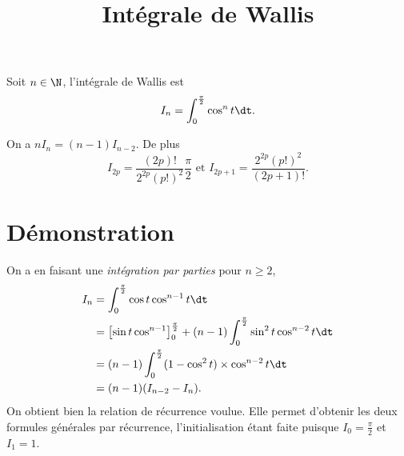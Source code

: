 \documentclass[fontsize=12pt,twoside=false,parskip=half, french]{scrartcl}
\title{Intégrale de Wallis}
\date{}
\author{}
\begin{document}
\maketitle
   Soit $n \in \N$, l’intégrale de Wallis est 
   \[
      I_n = \int_0^{\frac{\pi}{2}} \cos^n t \dt.
   \]
   \begin{Theoreme}
      On a $nI_n = (n - 1)I_{n - 2}$. De plus
      \[ 
          I_{2p} = \frac{(2p)!}{2^{2p}(p!)^2}\frac{\pi}{2} \text{ et }
          I_{2p + 1} = \frac{2^{2p}(p!)^2}{(2p + 1)!}.
      \]
   \end{Theoreme}
   \section{Démonstration}
      On a en faisant une \emph{intégration par parties} pour $n \geq 2$,
      \begin{align*}
         I_n &= \int_0^{\frac{\pi}{2}} \cos t \cos^{n - 1} t \dt\\
             &= \left[ \sin t \cos^{n - 1}\right]_0^{\frac{\pi}{2}} + (n - 1) \int_0^{\frac{\pi}{2}} \sin^2 t \cos^{n - 2} t \dt\\
             &= (n - 1) \int_0^{\frac{\pi}{2}} (1 - \cos^2 t) \times \cos^{n - 2} t \dt\\
             &= (n - 1) (I_{n - 2} - I_n).
      \end{align*}
      On obtient bien la relation de récurrence voulue. Elle permet d’obtenir les 
      deux formules générales par récurrence, l’initialisation étant faite
      puisque $I_0 = \frac{\pi}{2}$ et $I_1 = 1$.

\end{document}

